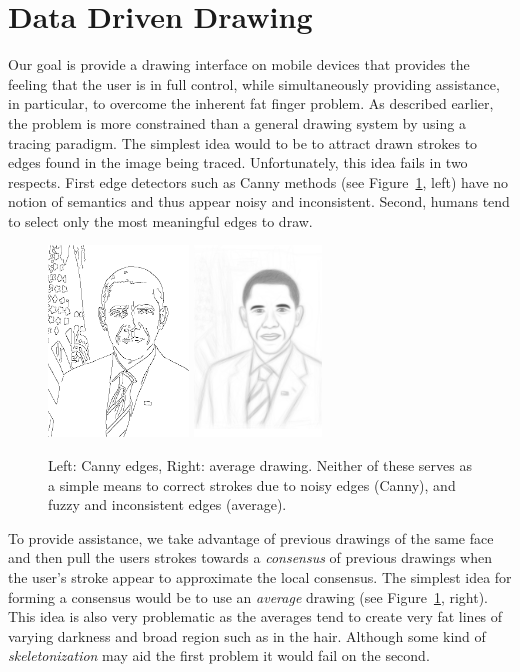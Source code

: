 \section{Data Driven Drawing}

Our goal is provide a drawing interface on mobile devices that provides the feeling that the user is in full control, while simultaneously providing assistance, in particular, to overcome the inherent fat finger problem. As described earlier, the problem is more constrained than a general drawing system by using a tracing paradigm. The simplest idea would to be to attract drawn strokes to edges found in the image being traced. Unfortunately, this idea fails in two respects. First edge detectors such as Canny methods (see Figure~\ref{fig:edges}, left) have no notion of semantics and thus appear noisy and inconsistent. Second, humans tend to select only the most meaningful edges to draw.

\begin{figure}
  \centering%
\includegraphics[height=2in]{figures/imagetable/edges_bo.png}
\hspace{0.1in}
\includegraphics[height=2in]{figures/imagetable/avg_bo.png}
  \caption{Left: Canny edges, Right: average drawing. Neither of these serves as a simple means to correct strokes due to noisy edges (Canny), and fuzzy and inconsistent edges (average).}
  \label{fig:edges}
\end{figure}

To provide assistance, we take advantage of previous drawings of the same face and then pull the users strokes towards a {\em consensus} of previous drawings when the user's stroke appear to approximate the local consensus. The simplest idea for forming a consensus would be to use an {\em average} drawing (see Figure~\ref{fig:edges}, right). This idea is also very problematic as the averages tend to create very fat lines of varying darkness and broad region such as in the hair. Although some kind of {\em skeletonization} may aid the first problem it would fail on the second.

